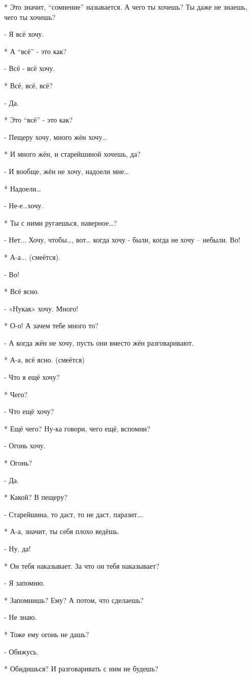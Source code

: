 * Это значит, “сомнение” называется. А чего ты хочешь? Ты даже не знаешь, чего ты хочешь?

- Я всё хочу.

* А “всё” - это как?

- Всё - всё хочу.

* Всё, всё, всё?

- Да.

* Это “всё” - это как?

- Пещеру хочу, много жён хочу…

* И много жён, и старейшиной хочешь, да?

- И вообще, жён не хочу, надоели мне…

* Надоели…

- Не-е…хочу.

* Ты с ними ругаешься, наверное…?

- Нет...  Хочу, чтобы…, вот… когда хочу - были, когда не хочу – небыли. Во!

* А-а... (смеётся).

- Во!

* Всё ясно.

- «Нукак» хочу. Много!

* О-о! А зачем тебе много то?

- А когда жён не хочу, пусть они вместо жён разговаривают.

* А-а, всё ясно. (смеётся)

- Что я ещё хочу?

* Чего?

- Что ещё хочу?

* Ещё чего? Ну-ка говори, чего ещё, вспомни?

- Огонь хочу.

* Огонь?

- Да.

* Какой? В пещеру?

-  Старейшина, то даст, то не даст, паразит….

* А-а, значит, ты себя плохо ведёшь.

- Ну, да!

* Он тебя наказывает. За что он тебя наказывает?

- Я запомню.

* Запомнишь? Ему? А потом, что сделаешь?

- Не знаю.

* Тоже ему огонь не дашь?

- Обижусь.

* Обидишься? И разговаривать с ним не будешь?

